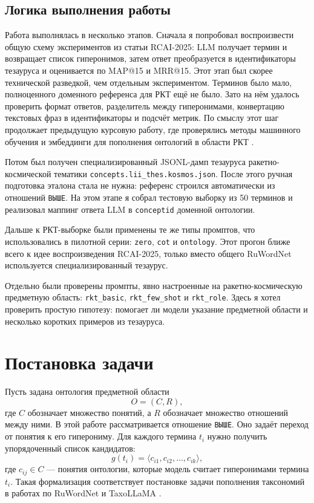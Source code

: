 \documentclass[12pt,a4paper,oneside,openany]{report}
\begin{document}
\section*{Логика выполнения работы}

Работа выполнялась в несколько этапов. Сначала я попробовал воспроизвести общую схему экспериментов из статьи RCAI-2025: LLM получает термин и возвращает список гиперонимов, затем ответ преобразуется в идентификаторы тезауруса и оценивается по MAP@15 и MRR@15. Этот этап был скорее технической разведкой, чем отдельным экспериментом. Терминов было мало, полноценного доменного референса для РКТ ещё не было. Зато на нём удалось проверить формат ответов, разделитель между гиперонимами, конвертацию текстовых фраз в идентификаторы и подсчёт метрик. По смыслу этот шаг продолжает предыдущую курсовую работу, где проверялись методы машинного обучения и эмбеддинги для пополнения онтологий в области РКТ \cite{liss2025kurs}.

Потом был получен специализированный JSONL-дамп тезауруса ракетно-космической тематики \texttt{concepts.lii\_thes.kosmos.json}. После этого ручная подготовка эталона стала не нужна: референс строился автоматически из отношений \texttt{ВЫШЕ}. На этом этапе я собрал тестовую выборку из 50 терминов и реализовал маппинг ответа LLM в \texttt{conceptid} доменной онтологии.

Дальше к РКТ-выборке были применены те же типы промптов, что использовались в пилотной серии: \texttt{zero}, \texttt{cot} и \texttt{ontology}. Этот прогон ближе всего к идее воспроизведения RCAI-2025, только вместо общего RuWordNet используется специализированный тезаурус.

Отдельно были проверены промпты, явно настроенные на ракетно-космическую предметную область: \texttt{rkt\_basic}, \texttt{rkt\_few\_shot} и \texttt{rkt\_role}. Здесь я хотел проверить простую гипотезу: помогает ли модели указание предметной области и несколько коротких примеров из тезауруса.

\chapter{Постановка задачи}

Пусть задана онтология предметной области
\[
O = (C, R),
\]
где $C$ обозначает множество понятий, а $R$ обозначает множество отношений между ними. В этой работе рассматривается отношение \texttt{ВЫШЕ}. Оно задаёт переход от понятия к его гиперониму. Для каждого термина $t_i$ нужно получить упорядоченный список кандидатов:
\[
g(t_i) = \langle c_{i1}, c_{i2}, \ldots, c_{ik} \rangle,
\]
где $c_{ij} \in C$ — понятия онтологии, которые модель считает гиперонимами термина $t_i$. Такая формализация соответствует постановке задачи пополнения таксономий в работах по RuWordNet и TaxoLLaMA \cite{nikishina2022,rcai2025,taxollama}.
\end{document}
